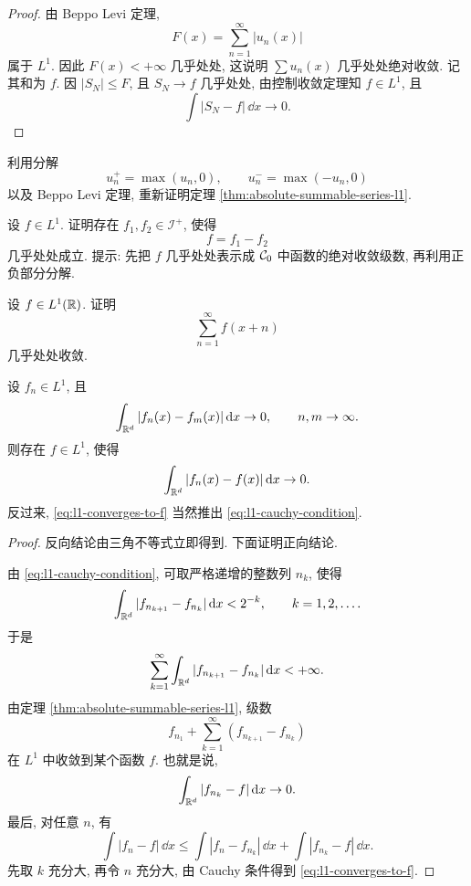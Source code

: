 \begin{proof}
	由 Beppo Levi 定理,
	\[
	F(x)=\sum_{n=1}^{\infty}|u_n(x)|
	\]
	属于 \(L^1\). 因此 \(F(x)<+\infty\) 几乎处处, 这说明 \(\sum u_n(x)\) 几乎处处绝对收敛. 记其和为 \(f\). 因 \(|S_N|\leq F\), 且 \(S_N\to f\) 几乎处处, 由控制收敛定理知 \(f\in L^1\), 且
	\[
	\int |S_N-f|\,\dd x\to0.
	\]
\end{proof}

\begin{exer}
	利用分解
	\[
	u_n^+=\max(u_n,0),
	\qquad
	u_n^-=\max(-u_n,0)
	\]
	以及 Beppo Levi 定理, 重新证明定理 \ref{thm:absolute-summable-series-l1}.
\end{exer}

\begin{exer}\label{exer:l1-decomposition-i-plus}
	设 \(f\in L^1\). 证明存在 \(f_1,f_2\in\mathcal I^+\), 使得
	\[
	f=f_1-f_2
	\]
	几乎处处成立. 提示: 先把 \(f\) 几乎处处表示成 \(\mathcal{C}_0\) 中函数的绝对收敛级数, 再利用正负部分分解.
\end{exer}

\begin{exer}
	设 \(f\in L^1(\mathbb{R})\). 证明
	\[
	\sum_{n=1}^{\infty}f(x+n)
	\]
	几乎处处收敛.
\end{exer}

\begin{thm}
	\label{thm:riesz-fischer-l1}
	设 \(f_n\in L^1\), 且
	\begin{equation}
		\int_{\mathbb{R}^d}|f_n(x)-f_m(x)|\,\dd x\to0,
		\qquad n,m\to\infty.
		\label{eq:l1-cauchy-condition}
	\end{equation}
	则存在 \(f\in L^1\), 使得
	\begin{equation}
		\int_{\mathbb{R}^d}|f_n(x)-f(x)|\,\dd x\to0.
		\label{eq:l1-converges-to-f}
	\end{equation}
	反过来, \eqref{eq:l1-converges-to-f} 当然推出 \eqref{eq:l1-cauchy-condition}.
\end{thm}

\begin{proof}
	反向结论由三角不等式立即得到. 下面证明正向结论.
	
	由 \eqref{eq:l1-cauchy-condition}, 可取严格递增的整数列 \(n_k\), 使得
	\[
	\int_{\mathbb{R}^d}|f_{n_{k+1}}-f_{n_k}|\,\dd x<2^{-k},
	\qquad k=1,2,\ldots.
	\]
	于是
	\[
	\sum_{k=1}^{\infty}\int_{\mathbb{R}^d}|f_{n_{k+1}}-f_{n_k}|\,\dd x<+\infty.
	\]
	由定理 \ref{thm:absolute-summable-series-l1}, 级数
	\[
	f_{n_1}+\sum_{k=1}^{\infty}(f_{n_{k+1}}-f_{n_k})
	\]
	在 \(L^1\) 中收敛到某个函数 \(f\). 也就是说,
	\[
	\int_{\mathbb{R}^d}|f_{n_k}-f|\,\dd x\to0.
	\]
	最后, 对任意 \(n\), 有
	\[
	\int |f_n-f|\,\dd x
	\leq
	\int |f_n-f_{n_k}|\,\dd x+
	\int |f_{n_k}-f|\,\dd x.
	\]
	先取 \(k\) 充分大, 再令 \(n\) 充分大, 由 Cauchy 条件得到 \eqref{eq:l1-converges-to-f}.
\end{proof}

